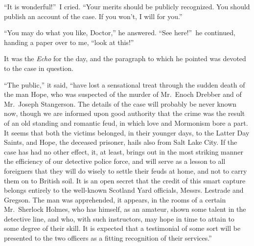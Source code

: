 \documentclass[12pt,english,oneside]{book}
\begin{document}
{}``It is wonderful!''\ I cried. {}``Your merits should be publicly
recognized. You should publish an account of the case. If you won't,
I will for you.''

{}``You may do what you like, Doctor,'' he answered. {}``See here!''\ he
continued, handing a paper over to me, {}``look at this!''

It was the \textit{Echo} for the day, and the paragraph to which he
pointed was devoted to the case in question.

{}``The public,'' it said, {}``have lost a sensational treat through
the sudden death of the man Hope, who was suspected of the murder
of Mr.\ Enoch Drebber and of Mr.\ Joseph Stangerson. The details
of the case will probably be never known now, though we are informed
upon good authority that the crime was the result of an old standing
and romantic feud, in which love and Mormonism bore a part. It seems
that both the victims belonged, in their younger days, to the Latter
Day Saints, and Hope, the deceased prisoner, hails also from Salt
Lake City. If the case has had no other effect, it, at least, brings
out in the most striking manner the efficiency of our detective police
force, and will serve as a lesson to all foreigners that they will
do wisely to settle their feuds at home, and not to carry them on
to British soil. It is an open secret that the credit of this smart
capture belongs entirely to the well-known Scotland Yard officials,
Messrs. Lestrade and Gregson. The man was apprehended, it appears,
in the rooms of a certain Mr.\ Sherlock Holmes, who has himself,
as an amateur, shown some talent in the detective line, and who, with
such instructors, may hope in time to attain to some degree of their
skill. It is expected that a testimonial of some sort will be presented
to the two officers as a fitting recognition of their services.''
\end{document}
